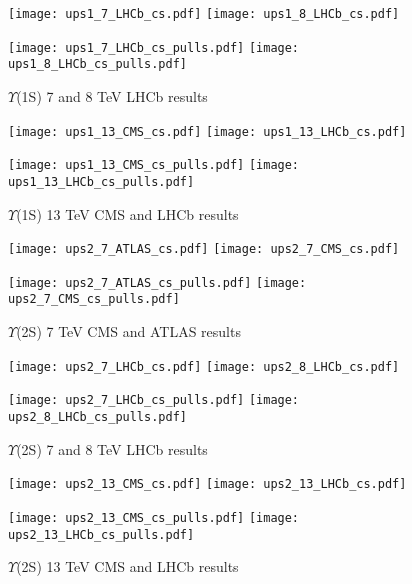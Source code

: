 \documentclass{article}
\begin{document}
\clearpage

\begin{figure}
\centering
\texttt{[image: ups1\_7\_LHCb\_cs.pdf]}
\texttt{[image: ups1\_8\_LHCb\_cs.pdf]}

\texttt{[image: ups1\_7\_LHCb\_cs\_pulls.pdf]}
\texttt{[image: ups1\_8\_LHCb\_cs\_pulls.pdf]}
\caption{$\Upsilon$(1S) 7 and 8 TeV LHCb results}
\end{figure}

\clearpage

\begin{figure}
\centering
\texttt{[image: ups1\_13\_CMS\_cs.pdf]}
\texttt{[image: ups1\_13\_LHCb\_cs.pdf]}

\texttt{[image: ups1\_13\_CMS\_cs\_pulls.pdf]}
\texttt{[image: ups1\_13\_LHCb\_cs\_pulls.pdf]}
\caption{$\Upsilon$(1S) 13 TeV CMS and LHCb results}
\end{figure}

\clearpage


\begin{figure}
\centering
\texttt{[image: ups2\_7\_ATLAS\_cs.pdf]}
\texttt{[image: ups2\_7\_CMS\_cs.pdf]}

\texttt{[image: ups2\_7\_ATLAS\_cs\_pulls.pdf]}
\texttt{[image: ups2\_7\_CMS\_cs\_pulls.pdf]}
\caption{$\Upsilon$(2S) 7 TeV CMS and ATLAS results}
\end{figure}

\clearpage

\begin{figure}
\centering
\texttt{[image: ups2\_7\_LHCb\_cs.pdf]}
\texttt{[image: ups2\_8\_LHCb\_cs.pdf]}

\texttt{[image: ups2\_7\_LHCb\_cs\_pulls.pdf]}
\texttt{[image: ups2\_8\_LHCb\_cs\_pulls.pdf]}
\caption{$\Upsilon$(2S) 7 and 8 TeV LHCb results}
\end{figure}

\clearpage

\begin{figure}
\centering
\texttt{[image: ups2\_13\_CMS\_cs.pdf]}
\texttt{[image: ups2\_13\_LHCb\_cs.pdf]}

\texttt{[image: ups2\_13\_CMS\_cs\_pulls.pdf]}
\texttt{[image: ups2\_13\_LHCb\_cs\_pulls.pdf]}
\caption{$\Upsilon$(2S) 13 TeV CMS and LHCb results}
\end{figure}
\end{document}
